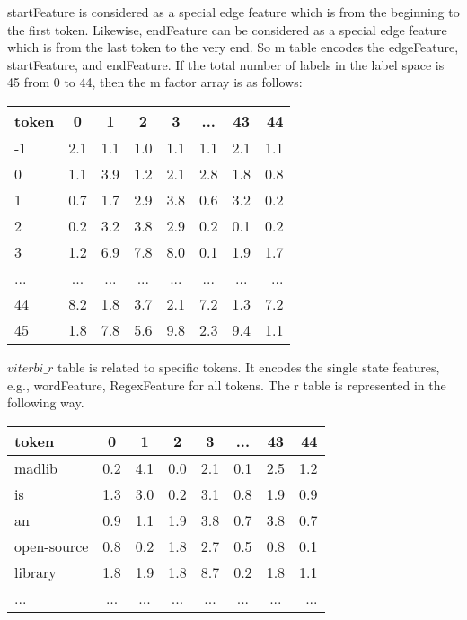   startFeature is considered as a special edge feature which is from the
  beginning to the first token. Likewise, endFeature can be considered
  as a special edge feature which is from the last token to the very end.
  So m table encodes the edgeFeature, startFeature, and endFeature.
  If the total number of labels in the label space is 45 from 0 to 44,
  then the m factor array is as follows:
  \begin{tabular}{l*{6}{c}r}
   token             & 0   & 1   & 2   & 3   & ... & 43 &  44 \\
   \hline
  -1                 & 2.1 & 1.1 & 1.0 & 1.1 & 1.1 & 2.1 & 1.1  \\
   0                 & 1.1 & 3.9 & 1.2 & 2.1 & 2.8 & 1.8 & 0.8  \\
   1                 & 0.7 & 1.7 & 2.9 & 3.8 & 0.6 & 3.2 & 0.2  \\
   2                 & 0.2 & 3.2 & 3.8 & 2.9 & 0.2 & 0.1 & 0.2  \\
   3                 & 1.2 & 6.9 & 7.8 & 8.0 & 0.1 & 1.9 & 1.7  \\
   ...               & ... & ... & ... & ... & ... & ... & ...  \\
   44                & 8.2 & 1.8 & 3.7 & 2.1 & 7.2 & 1.3 & 7.2  \\
   45                & 1.8 & 7.8 & 5.6 & 9.8 & 2.3 & 9.4 & 1.1  \\
  \end{tabular}
 
  $viterbi\_r$ table
  is related to specific tokens. It encodes the single state features,
  e.g., wordFeature, RegexFeature for all tokens. The r table is represented
  in the following way.\\
  \begin{tabular}{l*{6}{c}r}
   token             & 0   & 1   & 2   & 3   & ... & 43 &  44 \\
   \hline
   madlib            & 0.2 & 4.1 & 0.0 & 2.1 & 0.1 & 2.5 & 1.2  \\
   is                & 1.3 & 3.0 & 0.2 & 3.1 & 0.8 & 1.9 & 0.9  \\
   an                & 0.9 & 1.1 & 1.9 & 3.8 & 0.7 & 3.8 & 0.7  \\
   open-source       & 0.8 & 0.2 & 1.8 & 2.7 & 0.5 & 0.8 & 0.1  \\
   library           & 1.8 & 1.9 & 1.8 & 8.7 & 0.2 & 1.8 & 1.1  \\
   ...               & ... & ... & ... & ... & ... & ... & ...  \\
  \end{tabular}

